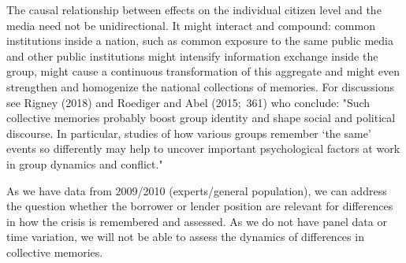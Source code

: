 The causal relationship between effects on the individual citizen level and
the media need not be unidirectional. It might interact and compound: common
institutions inside a nation, such as common exposure to the same public
media and other public institutions might intensify information exchange
inside the group, might cause a continuous transformation of this aggregate
and might even strengthen and homogenize the national collections of
memories. For discussions see Rigney (2018) and Roediger and Abel (2015;\
361) who conclude: "Such collective memories probably boost group identity
and shape social and political discourse. In particular, studies of how
various groups remember `the same' events so differently may help to uncover
important psychological factors at work in group dynamics and conflict."

As we have data from 2009/2010 (experts/general population), we can address
the question whether the borrower or lender position are relevant for
differences in how the crisis is remembered and assessed. As we do not have
panel data or time variation, we will not be able to assess the dynamics of
differences in collective memories.
